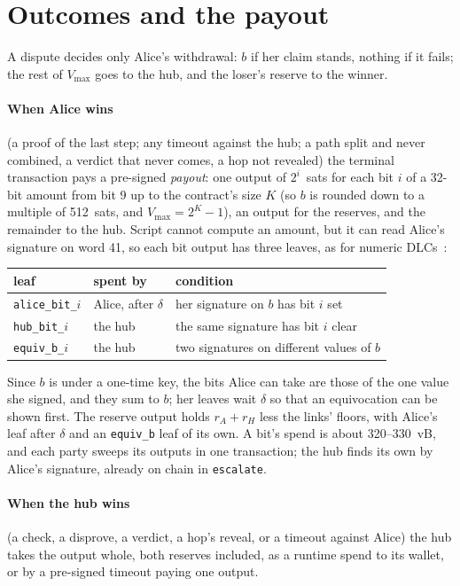 \documentclass[11pt]{article}
\newcommand{\vmax}{V_{\max}}
\newcommand{\tx}[1]{\texttt{#1}}
\begin{document}
\section{Outcomes and the payout}
\label{sec:payout}

A dispute decides only Alice's withdrawal: $b$ if her claim stands,
nothing if it fails; the rest of $\vmax$ goes to the hub, and the loser's
reserve to the winner.

\paragraph{When Alice wins} (a proof of the last step; any timeout
against the hub; a path split and never combined, a verdict that never
comes, a hop not revealed) the terminal transaction pays a pre-signed
\emph{payout}: one output of $2^i$~sats for each bit $i$ of a 32-bit
amount from bit 9 up to the contract's size $K$ (so $b$ is rounded down
to a multiple of 512~sats, and $\vmax = 2^K - 1$), an output for the
reserves, and the remainder to the hub. Script cannot compute an amount,
but it can read Alice's signature on word 41, so each bit output has
three leaves, as for numeric DLCs~\cite{dlcnumeric}:
\begin{center}
\small
\begin{tabular}{lll}
\toprule
leaf & spent by & condition \\
\midrule
\tx{alice\_bit\_$i$} & Alice, after $\delta$ & her signature on $b$ has bit $i$ set \\
\tx{hub\_bit\_$i$} & the hub & the same signature has bit $i$ clear \\
\tx{equiv\_b\_$i$} & the hub & two signatures on different values of $b$ \\
\bottomrule
\end{tabular}
\end{center}
Since $b$ is under a one-time key, the bits Alice can take are those of
the one value she signed, and they sum to $b$; her leaves wait $\delta$
so that an equivocation can be shown first. The reserve output holds
$r_A + r_H$ less the links' floors, with Alice's leaf after $\delta$ and
an \tx{equiv\_b} leaf of its own. A bit's spend is about 320--330~vB, and
each party sweeps its outputs in one transaction; the hub finds its own
by Alice's signature, already on chain in \tx{escalate}.

\paragraph{When the hub wins} (a check, a disprove, a verdict, a hop's
reveal, or a timeout against Alice) the hub takes the output whole, both
reserves included, as a runtime spend to its wallet, or by a pre-signed
timeout paying one output.
\end{document}
